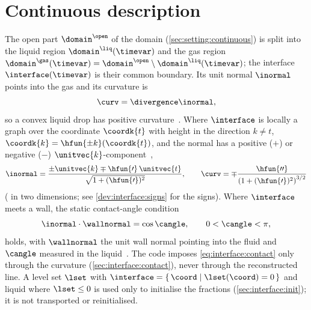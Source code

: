 \section{Continuous description}\label{sec:interface:continuous}
The open part $\domain^{\open}$ of the domain (\cref{sec:setting:continuous})
is split into the liquid region $\domain^{\liq}(\timevar)$ and the gas region
$\domain^{\gas}(\timevar)=\domain^{\open}\setminus\domain^{\liq}(\timevar)$;
the interface $\interface(\timevar)$ is their common boundary. Its unit normal
$\inormal$ points into the gas and its curvature is
\begin{equation}\label{eq:interface:curvature}
  \curv=\divergence\inormal ,
\end{equation}
so a convex liquid drop has positive curvature~. Where
$\interface$ is locally a graph over the coordinate $\coordk{t}$ with height in
the direction $k\neq t$, $\coordk{k}=\hfun{\pm k}(\coordk{t})$, and the normal
has a positive ($+$) or negative ($-$) $\unitvec{k}$-component~,
\begin{equation}\label{eq:interface:graph}
  \inormal=\frac{\pm\unitvec{k}\mp\hfun{\prime}\,\unitvec{t}}{\sqrt{1+(\hfun{\prime})^2}},
  \qquad
  \curv=\mp\frac{\hfun{\prime\prime}}{\roundpar{1+(\hfun{\prime})^2}^{3/2}}
\end{equation}
( in two dimensions; see
\cref{dev:interface:signs} for the signs). Where $\interface$ meets a wall, the
static contact-angle condition
\begin{equation}\label{eq:interface:contact}
  \inormal\cdot\wallnormal=\cos\cangle,\qquad 0<\cangle<\pi,
\end{equation}
holds, with $\wallnormal$ the unit wall normal pointing into the fluid and
$\cangle$ measured in the liquid~. The code imposes
\cref{eq:interface:contact} only through the curvature
(\cref{sec:interface:contact}), never through the reconstructed line. A level
set $\lset$ with $\interface=\set{\coord}{\lset(\coord)=0}$ and liquid where
$\lset\le0$ is used only to initialise the fractions
(\cref{sec:interface:init}); it is not transported or reinitialised.

